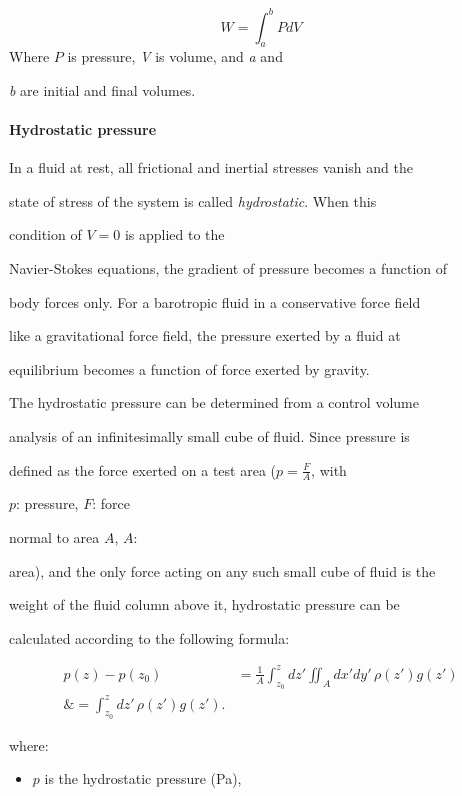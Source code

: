 $$W=\int _a^b{P}dV$$ Where $P$ is pressure, \textit{V} is volume, and \textit{a} and

\textit{b} are initial and final volumes.



\paragraph{Hydrostatic pressure}



In a fluid at rest, all frictional and inertial stresses vanish and the

state of stress of the system is called \textit{hydrostatic}. When this

condition of $V = 0$ is applied to the

Navier-Stokes equations, the gradient of pressure becomes a function of

body forces only. For a barotropic fluid in a conservative force field

like a gravitational force field, the pressure exerted by a fluid at

equilibrium becomes a function of force exerted by gravity.



The hydrostatic pressure can be determined from a control volume

analysis of an infinitesimally small cube of fluid. Since pressure is

defined as the force exerted on a test area ($p = \frac{F}{A}$, with

$p$: pressure, $F$: force

normal to area $A$, $A$:

area), and the only force acting on any such small cube of fluid is the

weight of the fluid column above it, hydrostatic pressure can be

calculated according to the following formula:



\begin{align}
p(z) - p(z _0) &= \frac{1}{A}\int _{z _0}^z dz' \iint _A dx' dy'\, \rho (z') g(z') \\\&= \int _{z _0}^z dz'\, \rho (z') g(z').
\end{align}



where:



\begin{itemize}
    \item $p$ is the hydrostatic pressure (Pa),
\end{itemize}

